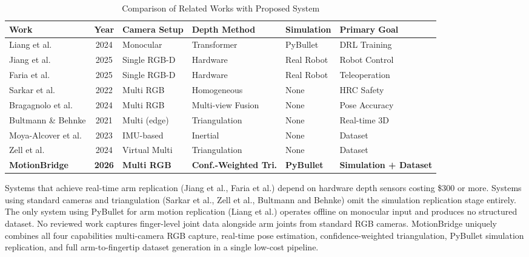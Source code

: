 \begin{table}[h!]
\centering
\caption{Comparison of Related Works with Proposed System}
\label{tab:comparison}
\renewcommand{\arraystretch}{1.4} %
\setlength{\tabcolsep}{6pt}       %
\small

\begin{tabularx}{\textwidth}{l c l X l X}
\toprule
\textbf{Work} & \textbf{Year} & \textbf{Camera Setup} & \textbf{Depth Method} & \textbf{Simulation} & \textbf{Primary Goal} \\
\midrule
Liang et al.       & 2024 & Monocular     & Transformer        & PyBullet   & DRL Training \\ \addlinespace[3pt]
Jiang et al.       & 2025 & Single RGB-D  & Hardware           & Real Robot & Robot Control \\ \addlinespace[3pt]
Faria et al.       & 2025 & Single RGB-D  & Hardware           & Real Robot & Teleoperation \\ \addlinespace[3pt]
Sarkar et al.      & 2022 & Multi RGB     & Homogeneous        & None       & HRC Safety \\ \addlinespace[3pt]
Bragagnolo et al.  & 2024 & Multi RGB     & Multi-view Fusion  & None       & Pose Accuracy \\ \addlinespace[3pt]
Bultmann \& Behnke & 2021 & Multi (edge)  & Triangulation      & None       & Real-time 3D \\ \addlinespace[3pt]
Moya-Alcover et al.& 2023 & IMU-based     & Inertial           & None       & Dataset \\ \addlinespace[3pt]
Zell et al.        & 2024 & Virtual Multi & Triangulation      & None       & Dataset \\ 
\midrule
\textbf{MotionBridge} & \textbf{2026} & \textbf{Multi RGB} & \textbf{Conf.-Weighted Tri.} & \textbf{ PyBullet} & \textbf{Simulation + Dataset} \\
\bottomrule
\end{tabularx}
\end{table}
 
Systems that achieve real-time arm replication (Jiang et al., Faria et al.) depend on hardware depth sensors costing \$300 or more. Systems using standard cameras and triangulation (Sarkar et al., Zell et al., Bultmann and Behnke) omit the simulation replication stage entirely. The only system using PyBullet for arm motion replication (Liang et al.) operates offline on monocular input and produces no structured dataset. No reviewed work captures finger-level joint data alongside arm joints from standard RGB cameras. MotionBridge uniquely combines all four capabilities multi-camera RGB capture, real-time pose estimation, confidence-weighted triangulation, PyBullet simulation replication, and full arm-to-fingertip dataset generation in a single low-cost pipeline.